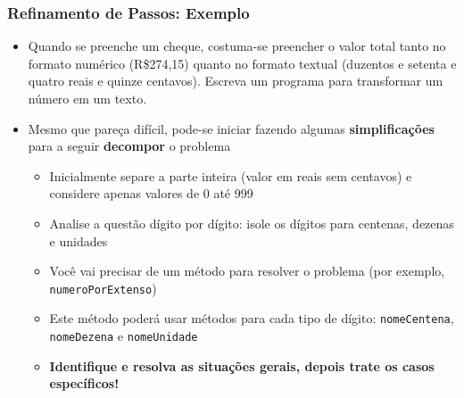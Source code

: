 \documentclass[xcolor={dvipsnames,table},aspectratio=169]{beamer}
\begin{document}
\begin{frame}
\begin{columns}[T]
\begin{column}{0.7\linewidth}
\begin{figure}[h]
\end{figure}
	\end{column}
\end{columns}
\end{frame}

\begin{frame}\frametitle{Refinamento de Passos: Exemplo}
\begin{itemize}
	\item Quando se preenche um cheque, costuma-se preencher o valor total tanto no formato numérico (R\$274,15) quanto no formato textual (duzentos e setenta e quatro reais e quinze centavos). Escreva um programa para transformar um número em um texto.
	\item Mesmo que pareça difícil, pode-se iniciar fazendo algumas \textbf{simplificações} para a seguir \textbf{decompor} o problema
	\begin{itemize}
		\item Inicialmente separe a parte inteira (valor em reais sem centavos) e considere apenas valores de 0 até 999
		\item Analise a questão dígito por dígito: isole os dígitos para centenas, dezenas e unidades
		\item Você vai precisar de um método para resolver o problema (por exemplo, \texttt{numeroPorExtenso})
		\item Este método poderá usar métodos para cada tipo de dígito: \texttt{nomeCentena}, \texttt{nomeDezena} e \texttt{nomeUnidade}
		\item \textbf{Identifique e resolva as situações gerais, depois trate os casos específicos!}
	\end{itemize}
\end{itemize}
\end{frame}
\end{document}
